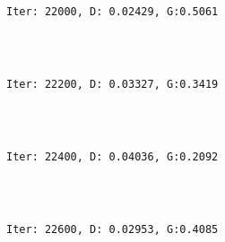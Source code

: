 \documentclass[11pt]{article}
\begin{document}
    \begin{center}
    \end{center}
    { \hspace*{\fill} \\}
    
    \begin{Verbatim}[commandchars=\\\{\}]

Iter: 22000, D: 0.02429, G:0.5061
    \end{Verbatim}

    \begin{center}
    \end{center}
    { \hspace*{\fill} \\}
    
    \begin{Verbatim}[commandchars=\\\{\}]

Iter: 22200, D: 0.03327, G:0.3419
    \end{Verbatim}

    \begin{center}
    \end{center}
    { \hspace*{\fill} \\}
    
    \begin{Verbatim}[commandchars=\\\{\}]

Iter: 22400, D: 0.04036, G:0.2092
    \end{Verbatim}

    \begin{center}
    \end{center}
    { \hspace*{\fill} \\}
    
    \begin{Verbatim}[commandchars=\\\{\}]

Iter: 22600, D: 0.02953, G:0.4085
    \end{Verbatim}

    \begin{center}
    \end{center}
    { \hspace*{\fill} \\}
    
\end{document}
